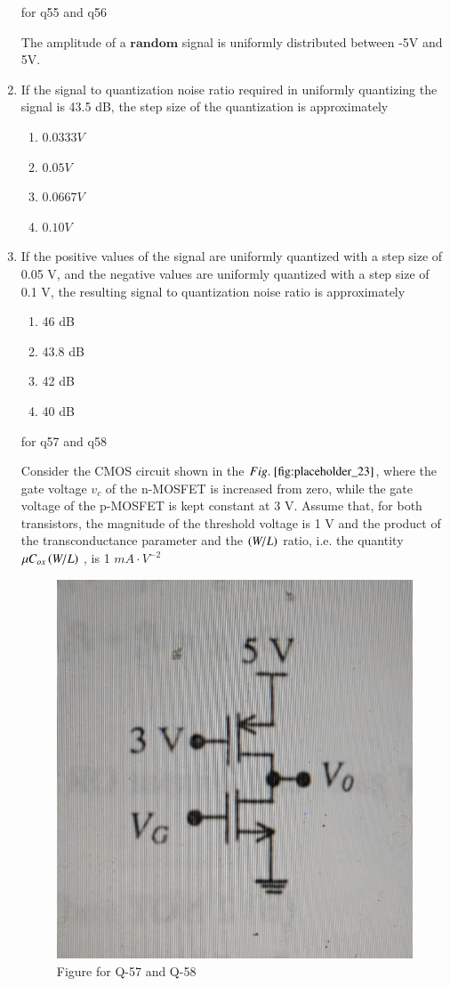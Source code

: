 \documentclass[journal,12pt,onecolumn]{IEEEtran}
\theoremstyle{remark}
\begin{document}
\begin{enumerate}[start=1, label={Q\arabic*.}]
for q55 and q56 

The amplitude of a $\textbf{random}$ signal is uniformly distributed between -5V and 5V.

\item If the signal to quantization noise ratio required in uniformly quantizing the signal is 43.5 dB, the step size of the quantization is approximately 
\begin{enumerate}
    \item $0.0333 V$
    \item $0.05 V$
    \item $0.0667 V$
    \item $0.10 V$
\end{enumerate}

\item If the positive values of the signal are uniformly quantized with a step size of 0.05 V, and the negative values are uniformly quantized with a step size of 0.1 V, the resulting signal to quantization noise ratio is approximately 
\begin{enumerate}
    \item 46 dB
    \item 43.8 dB
    \item 42 dB
    \item 40 dB
\end{enumerate}

for q57 and q58

Consider the CMOS circuit shown in the $\figref{fig:placeholder_23}$, where the gate voltage $v_{c}$ of the n-MOSFET is increased from zero, while the gate voltage of the p-MOSFET is kept constant at 3 V. Assume that, for both transistors, the magnitude of the threshold voltage is 1 V and the product of the transconductance parameter and the $\left(W/L\right)$ ratio, i.e. the quantity $\mu C_{ox} \left(W/L\right)$ , is 1 $mA \cdot V^{-2}$
\begin{figure}[H]
    \centering
    \includegraphics[width=0.5\columnwidth]{figs/img_23.jpg}
    \caption{\centering Figure for Q-57 and Q-58}
    \label{fig:placeholder_22}
\end{figure}


\end{enumerate}
\end{document}
